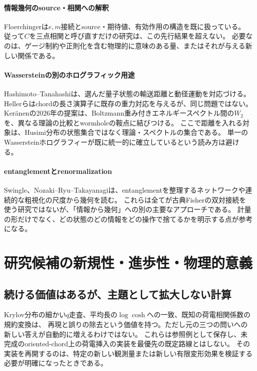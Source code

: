 \documentclass[a4paper,11pt]{ltjsarticle}
\numberwithin{equation}{section}
\begin{document}
\paragraph{情報幾何のsource・相関への解釈}
Floerchinger\cite{Floerchinger}は$e,m$接続とsource・期待値、有効作用の構造を既に扱っている。
従って$C$を三点相関と呼び直すだけの研究は、この先行結果を超えない。
必要なのは、ゲージ制約や正則化を含む物理的に意味のある量、またはそれが与える新しい関係である。

\paragraph{Wassersteinの別のホログラフィック用途}
Hashimoto--Tanahashi\cite{HT}は、選んだ量子状態の輸送距離と動径運動を対応づける。
Hellerら\cite{HPS}はchordの長さ演算子に既存の重力対応を与えるが、同じ問題ではない。
Ker\"anen\cite{Keranen}の2026年の提案は、Boltzmann重み付きエネルギースペクトル間の$W_2$を、異なる理論の比較とwormholeの鞍点に結びつける。
ここで距離を入れる対象は、Husimi分布の状態集合ではなく理論・スペクトルの集合である。
単一のWassersteinホログラフィーが既に統一的に確立しているという読み方は避ける。

\paragraph{entanglementとrenormalization}
Swingle\cite{Swingle}、Nozaki--Ryu--Takayanagi\cite{cMERA}は、entanglementを整理するネットワークや連続的な粗視化の尺度から幾何を読む。
これらは全てが古典Fisherの双対接続を使う研究ではないが、「情報から幾何」への別の主要なアプローチである。
計量の形だけでなく、どの状態のどの情報をどの操作で捨てるかを明示する点が参考になる。

\section{研究候補の新規性・進歩性・物理的意義}
\subsection{続ける価値はあるが、主題として拡大しない計算}
Krylov分布の細かい$q$走査、平均長の$\log\cosh$への一致、既知の荷電相関係数の規約変換は、
再現と誤りの除去という価値を持つ。ただし元の三つの問いへの新しい答えが自動的に増えるわけではない。
これらは参照例として保存し、未完成のoriented-chord上の荷電挿入の実装を最優先の既定路線とはしない。
その実装を再開するのは、特定の新しい観測量または新しい有限変形効果を検証する必要が明確になったときである。
\end{document}
